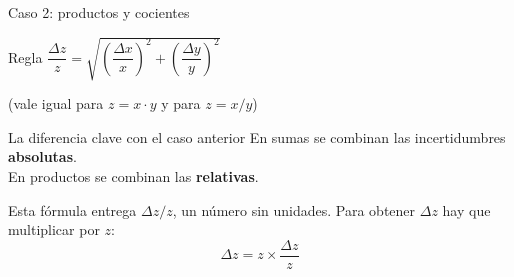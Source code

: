 \documentclass[aspectratio=169,xcolor=dvipsnames]{beamer}
\begin{document}
	\begin{frame}{Caso 2: productos y cocientes}
		\begin{exampleblock}{Regla}
			\centering
			\Large $\dfrac{\Delta z}{z} = \sqrt{\left(\dfrac{\Delta x}{x}\right)^{2}
				+ \left(\dfrac{\Delta y}{y}\right)^{2}}$
			\vspace{0.1cm}
			
			\small (vale igual para $z = x\cdot y$ y para $z = x/y$)
		\end{exampleblock}
		
		\vspace{0.4cm}
		\begin{alertblock}{La diferencia clave con el caso anterior}
			\centering
			En sumas se combinan las incertidumbres \textbf{absolutas}. \\[3pt]
			En productos se combinan las \textbf{relativas}.
		\end{alertblock}
		
		\vspace{0.3cm}
		\begin{center}
			\small Esta fórmula entrega $\Delta z / z$, un número sin unidades.
			Para obtener $\Delta z$ hay que multiplicar por $z$:
			\[
			\Delta z = z \times \frac{\Delta z}{z}
			\]
		\end{center}
	\end{frame}
	
\end{document}
